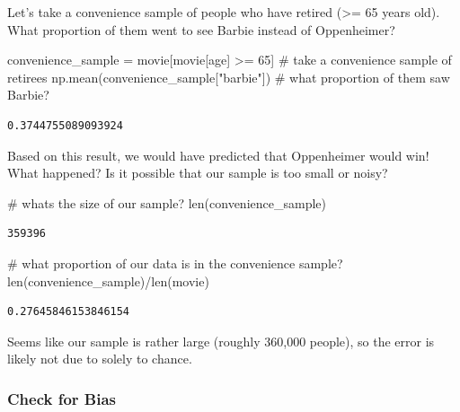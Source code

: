 \documentclass[
  letterpaper,
  DIV=11,
  numbers=noendperiod]{scrreprt}
\newenvironment{Shaded}{\begin{snugshade}}{\end{snugshade}}
\newcommand{\BuiltInTok}[1]{\textcolor[rgb]{0.00,0.23,0.31}{#1}}
\newcommand{\CommentTok}[1]{\textcolor[rgb]{0.37,0.37,0.37}{#1}}
\newcommand{\DecValTok}[1]{\textcolor[rgb]{0.68,0.00,0.00}{#1}}
\newcommand{\NormalTok}[1]{\textcolor[rgb]{0.00,0.23,0.31}{#1}}
\newcommand{\OperatorTok}[1]{\textcolor[rgb]{0.37,0.37,0.37}{#1}}
\newcommand{\StringTok}[1]{\textcolor[rgb]{0.13,0.47,0.30}{#1}}
\begin{document}
Let's take a convenience sample of people who have retired
(\textgreater= 65 years old). What proportion of them went to see Barbie
instead of Oppenheimer?

\begin{Shaded}
\begin{Highlighting}[]
\NormalTok{convenience\_sample }\OperatorTok{=}\NormalTok{ movie[movie[}\StringTok{\textquotesingle{}age\textquotesingle{}}\NormalTok{] }\OperatorTok{\textgreater{}=} \DecValTok{65}\NormalTok{] }\CommentTok{\# take a convenience sample of retirees}
\NormalTok{np.mean(convenience\_sample[}\StringTok{"barbie"}\NormalTok{]) }\CommentTok{\# what proportion of them saw Barbie? }
\end{Highlighting}
\end{Shaded}

\begin{verbatim}
0.3744755089093924
\end{verbatim}

Based on this result, we would have predicted that Oppenheimer would
win! What happened? Is it possible that our sample is too small or
noisy?

\begin{Shaded}
\begin{Highlighting}[]
\CommentTok{\# what\textquotesingle{}s the size of our sample? }
\BuiltInTok{len}\NormalTok{(convenience\_sample)}
\end{Highlighting}
\end{Shaded}

\begin{verbatim}
359396
\end{verbatim}

\begin{Shaded}
\begin{Highlighting}[]
\CommentTok{\# what proportion of our data is in the convenience sample? }
\BuiltInTok{len}\NormalTok{(convenience\_sample)}\OperatorTok{/}\BuiltInTok{len}\NormalTok{(movie)}
\end{Highlighting}
\end{Shaded}

\begin{verbatim}
0.27645846153846154
\end{verbatim}

Seems like our sample is rather large (roughly 360,000 people), so the
error is likely not due to solely to chance.

\subsubsection{Check for Bias}\label{check-for-bias}
\end{document}
